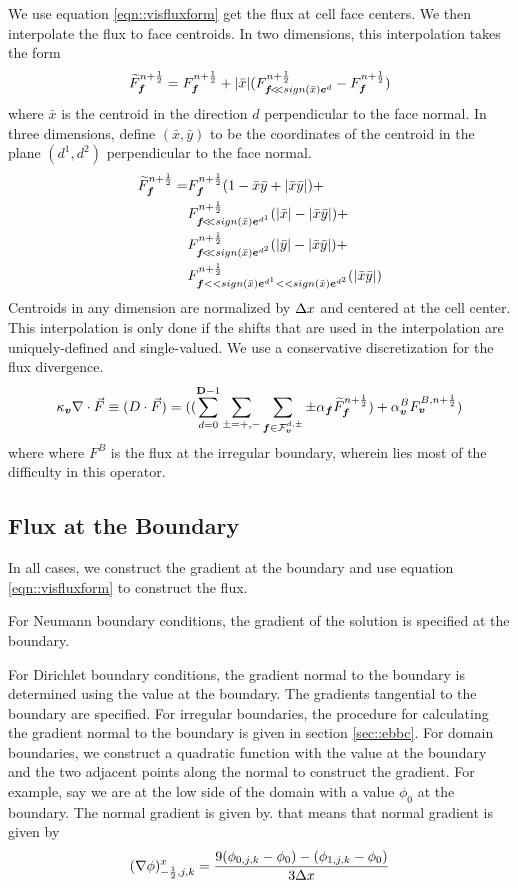We use equation \ref{eqn::visfluxform} get the flux at cell face
centers.   We then interpolate the flux to face centroids.
In two dimensions, this interpolation takes the form
\begin{gather}
\widetilde{F}^{n + \frac{1}{2}}_{\boldsymbol{f}} = 
F^{n + \frac{1}{2}}_{\boldsymbol{f}}  + |\bar x| 
(F^{n + \frac{1}{2}}_{{{\boldsymbol{f}}} \! < \!\! < \! {\,sign(\bar x) {\boldsymbol{e}}^d}}-F^{n + \frac{1}{2}}_{\boldsymbol{f}}) 
\end{gather}
where $\bar x$ is the centroid in the direction $d$ perpendicular to the
face normal. In three dimensions, define $(\bar x, \bar y)$ to be the
coordinates of the centroid in the plane $(d^1, d^2)$ perpendicular 
to the face normal. 
\begin{align}
\widetilde{F}^\nph_\fbold =& 
F^\nph_\fbold( 1 -\bar x \bar y + |\bar x \bar y | ) + \\
&F^\nph_{\ebshift{\fbold}{\,sign(\bar x) \ebold^{d^1}}} 
(|\bar x| - |\bar x \bar y|) + \\
&F^\nph_{\ebshift{\fbold}{\,sign(\bar x) \ebold^{d^2}}} 
(|\bar y| - |\bar x \bar y|) + \\
&F^\nph_{\fbold << sign(\bar x) \ebold^{d^1} << sign(\bar x)
\ebold^{d^2}}  (|\bar x \bar y |)
\end{align}
Centroids in any dimension are normalized by $\Delta x$ and centered at the
cell center.   This interpolation is only done if the shifts that are
used in the interpolation are uniquely-defined and single-valued.
We use a conservative discretization for the flux divergence.
\begin{gather}
\kappa_{\boldsymbol{v}} \nabla \cdot \vec{F} \equiv (D \cdot \vec{F}) = 
((\sum^{{\mathbf{D}}-1}_{d=0} \sum_{\pm = +,-} \sum_{{\boldsymbol{f}} \in
\mathcal{F}^{d, \pm}_{\boldsymbol{v}}} \pm \alpha_{\boldsymbol{f}} \widetilde{F}^{n + \frac{1}{2}}_{\boldsymbol{f}}) +
\alpha^B_{\boldsymbol{v}} F^{B, {n + \frac{1}{2}}}_{\boldsymbol{v}}) 
\end{gather}
where 
where $F^B$ is the flux at the irregular boundary, wherein lies most
of the difficulty in this operator.

\subsection{Flux at the Boundary}
In all cases, we construct the gradient at the boundary and use 
equation \ref{eqn::visfluxform} to construct the flux.

For Neumann boundary conditions, the gradient of the solution is
specified at the boundary.

For Dirichlet boundary conditions, the gradient normal to the boundary
is determined using the value at the boundary.  The gradients
tangential to the boundary are specified.  For irregular
boundaries, the procedure for calculating the gradient normal to the
boundary is given in section \ref{sec::ebbc}.   For domain boundaries,
we construct a quadratic function with the value at the boundary and
the two adjacent points along the normal to construct the gradient.
For example, say we are at the low side of the domain with a value 
$\phi_0$ at the boundary.  The normal gradient is given by.
that means that normal gradient  is given by
$$
(\nabla \phi)^x_{-\frac{1}{2}, j, k} = \frac{9(\phi_{0,j,k}-\phi_0)  -
  (\phi_{1,j,k}-\phi_0)}{3 \Delta x}
$$
